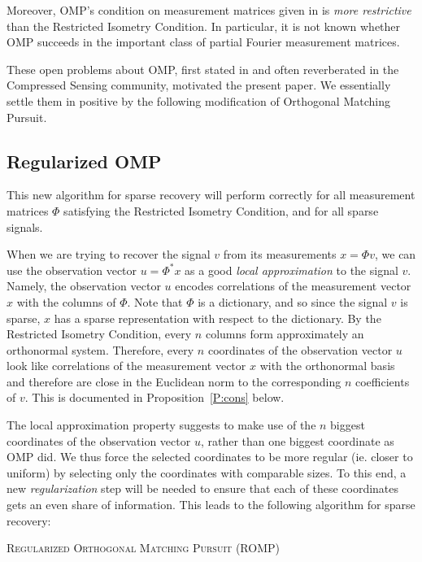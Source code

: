 \documentclass[12pt]{amsart}
\theoremstyle{plain}
\theoremstyle{definition}
\theoremstyle{remark}
\numberwithin{equation}{section}
\begin{document}
Moreover, OMP's condition on measurement matrices given in \cite{TG} 
is {\em more restrictive} than the Restricted Isometry Condition. 
In particular, it is not known whether OMP succeeds in the important 
class of partial Fourier measurement matrices.

These open problems about OMP, first stated in \cite{TG} and often reverberated 
in the Compressed Sensing community, motivated the present paper.
We essentially settle them in positive by the following modification of 
Orthogonal Matching Pursuit.

\subsection{Regularized OMP}

This new algorithm for sparse recovery will perform correctly for all 
measurement matrices $\Phi$ satisfying the Restricted Isometry Condition,
and for all sparse signals.

When we are trying to recover the signal $v$ from its measurements $x = \Phi v$,
we can use the observation vector $u = \Phi^* x$ as a good {\em local 
approximation} to the signal $v$. Namely, the observation vector $u$
encodes correlations of the measurement vector $x$ with the columns of $\Phi$. Note that $\Phi$ is a 
dictionary, and so since the signal $v$ is sparse, $x$ has a sparse representation with
respect to the dictionary. By the Restricted 
Isometry Condition, every $n$ columns form approximately an orthonormal system.
Therefore, every $n$ coordinates of the observation vector $u$ look like correlations of the measurement vector $x$ 
with the orthonormal basis and therefore are close in the Euclidean norm to the corresponding $n$ coefficients of $v$. 
This is documented in Proposition~\ref{P:cons} below.

The local approximation property suggests to make use of the $n$ biggest coordinates of 
the observation vector $u$, rather than one biggest coordinate as OMP did.
We thus force the selected coordinates to be more regular (ie. closer to uniform) by selecting only the coordinates with comparable sizes. To this end, a new {\em regularization} step will be needed to ensure
that each of these coordinates gets an even share of information. This leads to the following algorithm for sparse recovery:

\bigskip

\textsc{Regularized Orthogonal Matching Pursuit (ROMP)}

\nopagebreak
\end{document}
